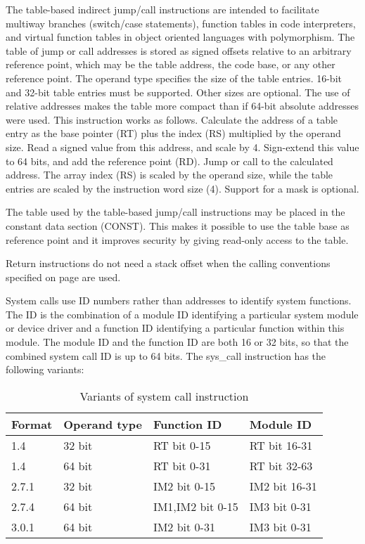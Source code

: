 \documentclass[forwardcom.tex]{subfiles}
\begin{document}
\label{jumpTableInstruction}
The table-based indirect jump/call instructions are intended to facilitate multiway branches (switch/case statements), function tables in code interpreters, and virtual function tables in object oriented languages with polymorphism. The table of jump or call addresses is stored as signed offsets relative to an arbitrary reference point, which may be the table address, the code base, or any other reference point. The operand type specifies the size of the table entries. 16-bit and 32-bit table entries must be supported. Other sizes are optional. The use of relative addresses makes the table more compact than if 64-bit absolute addresses were used. This instruction works as follows. Calculate the address of a table entry as the base pointer (RT) plus the index (RS) multiplied by the operand size. Read a signed value from this address, and scale by 4. Sign-extend this value to 64 bits, and add the reference point (RD). Jump or call to the calculated address. The array index (RS) is scaled by the operand size, while the table entries are scaled by the instruction word size (4). Support for a mask is optional.
\vspace{2mm}

The table used by the table-based jump/call instructions may be placed in the constant data section (CONST). This makes it possible to use the table base as reference point and it improves security by giving read-only access to the table.
\vspace{2mm}

Return instructions do not need a stack offset when the calling conventions specified on page \pageref{functionCallingConventions} are used.
\vspace{2mm}

\label{systemCallInstruction}
System calls use ID numbers rather than addresses to identify system functions. 
The ID is the combination of a module ID identifying a particular system module or device driver and a function ID identifying a particular function within this module. The module ID and the function ID are both 16 or 32 bits, so that the combined system call ID is up to 64 bits.
The sys\_call instruction has the following variants:

\begin{longtable}
{|p{30mm}|p{30mm}|p{30mm}|p{30mm}|}
\caption{Variants of system call instruction}
\label{table:syscallInstructions}
\endfirsthead
\endhead
\hline
Format & Operand type & Function ID & Module ID \\
\hline
1.4 & 32 bit & RT bit 0-15 & RT bit 16-31  \\
\hline
1.4 & 64 bit & RT bit 0-31 & RT bit 32-63  \\
\hline
2.7.1 & 32 bit & IM2 bit 0-15 & IM2 bit 16-31 \\
\hline
2.7.4 & 64 bit & IM1,IM2 bit 0-15 & IM3 bit 0-31 \\
\hline
3.0.1 & 64 bit & IM2 bit 0-31 & IM3 bit 0-31 \\
\hline
\end{longtable}
\end{document}
